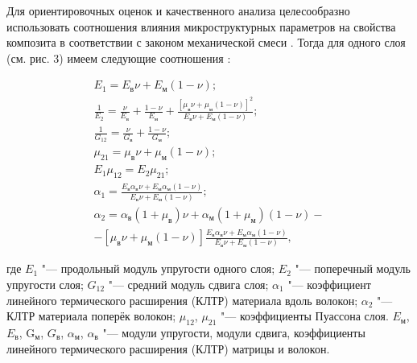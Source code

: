 Для ориентировочных оценок и качественного анализа целесообразно использовать соотношения влияния микроструктурных параметров на свойства композита в соответствии с законом механической смеси \cite{bit:bib10}. Тогда для одного слоя (см. рис. 3) имеем следующие соотношения \cite{bit:bib2}:

\begin{gather*}



E_1=E_\textit{в}\nu+E_\textit{м}(1-\nu);

\\

\displaystyle \frac{1}{E_2}=\frac{\nu}{E_\textit{в}}+\frac{1-\nu}{E_\textit{м}}+\frac{[\mu_\textit{в}\nu+\mu_\textit{м}(1-\nu)]^2}{E_\textit{в}\nu+E_\textit{м}(1-\nu)};

\\

\displaystyle \frac{1}{G_{12}}=\frac{\nu}{G_\textit{в}}+\frac{1-\nu}{G_\textit{м}};

\\

\mu_{21}=\mu_\textit{в}\nu+\mu_\textit{м}(1-\nu);

\\

E_1\mu_{12}=E_2\mu_{21};

\\

\displaystyle \alpha_1=\frac{E_\textit{в}\alpha_\textit{в}\nu+E_\textit{м}\alpha_\textit{м}(1-\nu)}{E_\textit{в}\nu+E_\textit{м}(1-\nu)};

\\

\displaystyle \alpha_2=\alpha_\textit{в}(1+\mu_\textit{в})\nu+\alpha_\textit{м}(1+\mu_\textit{м})(1-\nu)-

\\

-[\mu_\textit{в}\nu+\mu_\textit{м}(1-\nu)]\frac{E_\textit{в}\alpha_\textit{в}\nu+E_\textit{м}\alpha_\textit{м}(1-\nu)}{E_\textit{в}\nu+E_\textit{м}(1-\nu)},


\end{gather*}

где $E_1$ "--- продольный модуль упругости одного слоя; $E_{2}$ "--- поперечный модуль упругости слоя; $G_{12}$ "--- средний модуль сдвига слоя; $\alpha_1$ "--- коэффициент линейного термического расширения (КЛТР) материала вдоль волокон; $\alpha_2$ "--- КЛТР материала поперёк волокон; $\mu_{12}$, $\mu_{21}$ "--- коэффициенты Пуассона слоя. $E_{\textit{м}}$, $E_{\textit{в}}$, G$_{\textit{м}}$, $G_{\textit{в}}$, $\alpha_{\textit{м}}$, $\alpha _{\textit{в}}$ "--- модули упругости, модули сдвига, коэффициенты линейного термического расширения (КЛТР) матрицы и волокон.



